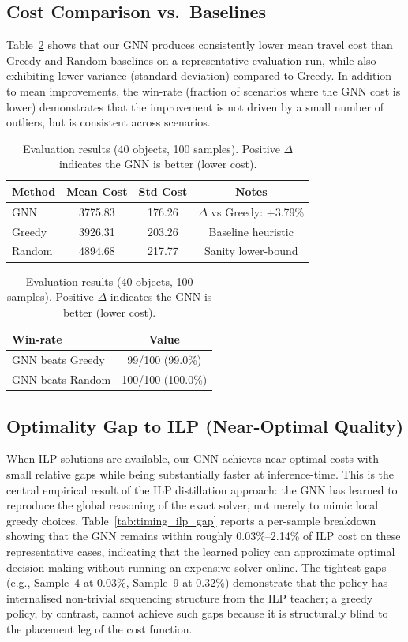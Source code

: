 \documentclass[conference]{IEEEtran}
\begin{document}
\subsection{Cost Comparison vs.\ Baselines}
Table~\ref{tab:results_40obj_100} shows that our GNN produces consistently lower mean travel cost than Greedy and Random baselines on a representative evaluation run, while also exhibiting lower variance (standard deviation) compared to Greedy. 
In addition to mean improvements, the win-rate (fraction of scenarios where the GNN cost is lower) demonstrates that the improvement is not driven by a small number of outliers, but is consistent across scenarios.

\begin{table}[htbp]
\caption{Evaluation results (40 objects, 100 samples). Positive $\Delta$ indicates the GNN is better (lower cost).}
\label{tab:results_40obj_100}
\centering
\begin{tabular}{|l|c|c|c|}
\hline
\textbf{Method} & \textbf{Mean Cost} & \textbf{Std Cost} & \textbf{Notes} \\
\hline
GNN & 3775.83 & 176.26 & $\Delta$ vs Greedy: +3.79\% \\
Greedy & 3926.31 & 203.26 & Baseline heuristic \\
Random & 4894.68 & 217.77 & Sanity lower-bound \\
\hline
\end{tabular}
\vspace{2mm}

\begin{tabular}{|l|c|}
\hline
\textbf{Win-rate} & \textbf{Value} \\
\hline
GNN beats Greedy & 99/100 (99.0\%) \\
GNN beats Random & 100/100 (100.0\%) \\
\hline
\end{tabular}
\end{table}

\subsection{Optimality Gap to ILP (Near-Optimal Quality)}
When ILP solutions are available, our GNN achieves near-optimal costs with small relative gaps while being substantially faster at inference-time. This is the central empirical result of the ILP distillation approach: the GNN has learned to reproduce the global reasoning of the exact solver, not merely to mimic local greedy choices.
Table~\ref{tab:timing_ilp_gap} reports a per-sample breakdown showing that the GNN remains within roughly 0.03\%--2.14\% of ILP cost on these representative cases, indicating that the learned policy can approximate optimal decision-making without running an expensive solver online. The tightest gaps (e.g., Sample~4 at 0.03\%, Sample~9 at 0.32\%) demonstrate that the policy has internalised non-trivial sequencing structure from the ILP teacher; a greedy policy, by contrast, cannot achieve such gaps because it is structurally blind to the placement leg of the cost function.
\end{document}
